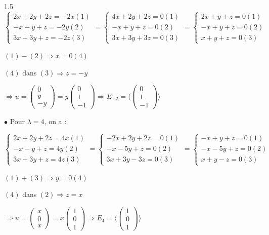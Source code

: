 \documentclass[12pt]{article}
\begin{document}
\begin{spacing}{1.5}
$\begin{cases}
2x+2y+2z=-2x(1)\\
-x-y+z=-2y(2)\\
3x+3y+z=-2z(3)
\end{cases}=\begin{cases}
4x+2y+2z=0(1)\\
-x+y+z=0(2)\\
3x+3y+3z=0(3)
\end{cases}=\begin{cases}
2x+y+z=0(1)\\
-x+y+z=0(2)\\
x+y+z=0(3)
\end{cases}$

$(1)-(2)\Rightarrow x=0 (4)$

$(4)$ dans $(3)\Longrightarrow z=-y$

$\Rightarrow u=\begin{pmatrix}
0\\
y\\
-y
\end{pmatrix}=y\begin{pmatrix}
0\\
1\\
-1
\end{pmatrix}\Rightarrow E_{-2}=\langle \begin{pmatrix}
0 \\
1 \\
-1
\end{pmatrix}\rangle$

$\bullet$ Pour $\lambda=4$, on a :

$\begin{cases}
2x+2y+2z=4x(1)\\
-x-y+z=4y(2)\\
3x+3y+z=4z(3)
\end{cases}=\begin{cases}
-2x+2y+2z=0(1)\\
-x-5y+z=0(2)\\
3x+3y-3z=0(3)
\end{cases}=\begin{cases}
-x+y+z=0(1)\\
-x-5y+z=0(2)\\
x+y-z=0(3)
\end{cases}$

$(1)+(3)\Rightarrow y=0 (4)$

$(4)$ dans $(2)\Longrightarrow z=x$

$\Rightarrow u=\begin{pmatrix}
x\\
0\\
x
\end{pmatrix}=x\begin{pmatrix}
1\\
0\\
1
\end{pmatrix}\Rightarrow E_{4}=\langle \begin{pmatrix}
1\\
0\\
1
\end{pmatrix}\rangle$


\end{spacing}
\end{document}
